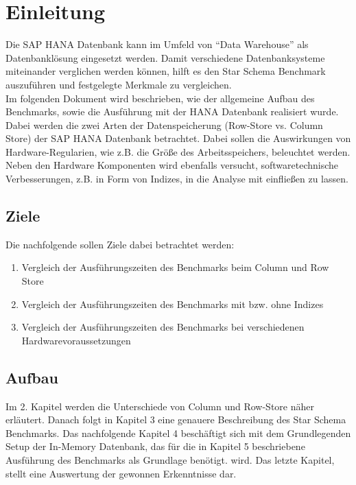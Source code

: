 \chapter{Einleitung}

Die SAP HANA Datenbank kann im Umfeld von \enquote{Data Warehouse} als Datenbanklösung eingesetzt werden. Damit verschiedene Datenbanksysteme miteinander verglichen werden können, hilft es den Star Schema Benchmark auszuführen und festgelegte Merkmale zu vergleichen.\\Im folgenden Dokument wird beschrieben, wie der allgemeine Aufbau des Benchmarks, sowie die Ausführung mit der HANA Datenbank realisiert wurde. Dabei werden die zwei Arten der Datenspeicherung (Row-Store vs. Column Store) der SAP HANA Datenbank betrachtet. Dabei sollen die Auswirkungen von Hardware-Regularien, wie z.B. die Größe des Arbeitsspeichers, beleuchtet werden. Neben den Hardware Komponenten wird ebenfalls versucht, softwaretechnische Verbesserungen, z.B. in Form von Indizes, in die Analyse mit einfließen zu lassen.

\section{Ziele}
Die nachfolgende sollen Ziele dabei betrachtet werden:
\begin{enumerate}
	\item Vergleich der Ausführungszeiten des Benchmarks beim Column und Row Store
	\item Vergleich der Ausführungszeiten des Benchmarks mit bzw. ohne Indizes
	\item Vergleich der Ausführungszeiten des Benchmarks bei verschiedenen Hardwarevoraussetzungen
\end{enumerate}

\section{Aufbau}
Im 2. Kapitel werden die Unterschiede von Column und Row-Store näher erläutert. Danach folgt in Kapitel 3 eine genauere Beschreibung des Star Schema Benchmarks. Das nachfolgende Kapitel 4 beschäftigt sich mit dem Grundlegenden Setup der In-Memory Datenbank, das für die in Kapitel 5 beschriebene Ausführung des Benchmarks als Grundlage benötigt. wird. Das letzte Kapitel, stellt eine Auswertung der gewonnen Erkenntnisse dar.
